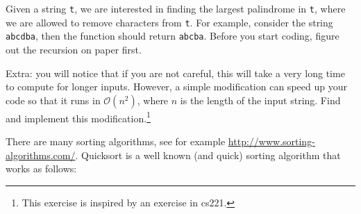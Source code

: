 \begin{questions}
\begin{parts}
\end{parts}


\label{sub:palindromes}

Given a string \texttt{t}, we are interested in finding the largest palindrome in \texttt{t},
where we are allowed to remove characters from \texttt{t}.
For example, consider the string \texttt{abcdba}, then the function should return \texttt{abcba}. Before you start coding, figure out the recursion on paper first.

Extra: you will notice that if you are not careful, this will take a very long time to compute for longer inputs. However, a simple modification can speed up your code so that it runs in $\mathcal{O}(n^2)$, where $n$ is the length of the input string. Find and implement this modification.\footnote{This exercise is inspired by an exercise in cs221.}


\label{sub:quicksort}

There are many sorting algorithms, see for example \url{http://www.sorting-algorithms.com/}.
Quicksort is a well known (and quick) sorting algorithm that works as follows:



\end{questions}
